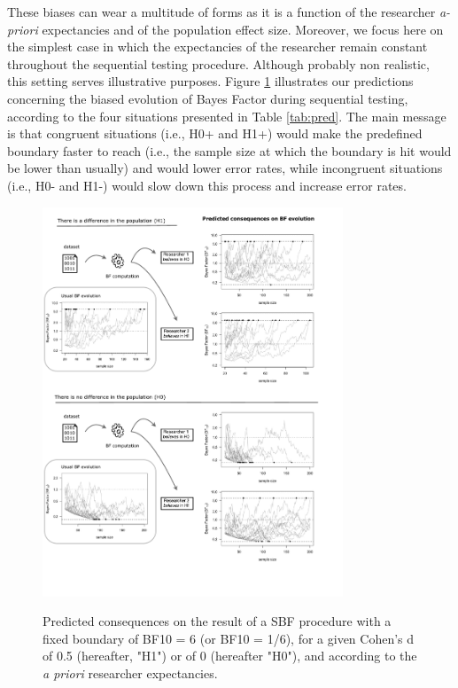 \documentclass[a4paper,man,natbib,floatsintext,donotrepeattitle]{apa6}
\begin{document}

These biases can wear a multitude of forms as it is a function of the researcher \textit{a-priori} expectancies and of the population effect size. Moreover, we focus here on the simplest case in which the expectancies of the researcher remain constant throughout the sequential testing procedure. Although probably non realistic, this setting serves illustrative purposes. Figure \ref{fig:pred} illustrates our predictions concerning the biased evolution of Bayes Factor during sequential testing, according to the four situations presented in Table \ref{tab:pred}. The main message is that congruent situations (i.e., H0+ and H1+) would make the predefined boundary faster to reach (i.e., the sample size at which the boundary is hit would be lower than usually) and would lower error rates, while incongruent situations (i.e., H0- and H1-) would slow down this process and increase error rates.


\begin{figure}[H]
  \caption{Predicted consequences on the result of a SBF procedure with a fixed boundary of BF10 = 6 (or BF10 = 1/6), for a given Cohen's d of 0.5 (hereafter, "H1") or of 0 (hereafter "H0"), and according to the \emph{a priori} researcher expectancies.}
  \centering
  \includegraphics[width=0.8\textwidth]{figures/BFF_predictions.pdf}
  \label{fig:pred}
\end{figure}
\end{document}

